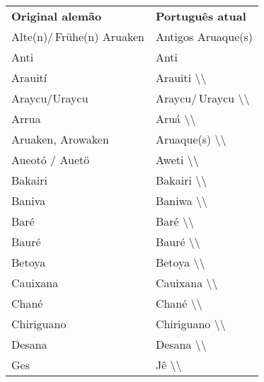 
\begin{table}[]
\begin{tabular}{|l|l|}
\textbf{Original alemão}   & \textbf{Português atual}                          \\
Alte(n)/\,Frühe(n) Aruaken & Antigos Aruaque(s)                             \\
Anti                       & Anti                                           \\
Arauití                    & Arauiti \textbackslash{}\textbackslash{}       \\
Araycu/Uraycu              & Araycu/\,Uraycu \textbackslash{}\textbackslash{} \\
Arrua                      & Aruá \textbackslash{}\textbackslash{}          \\
Aruaken, Arowaken          & Aruaque(s) \textbackslash{}\textbackslash{}    \\
Aueotó / Auetö             & Aweti \textbackslash{}\textbackslash{}         \\
Bakairi                    & Bakairi \textbackslash{}\textbackslash{}       \\
Baniva                     & Baniwa \textbackslash{}\textbackslash{}        \\
Baré                       & Baré \textbackslash{}\textbackslash{}          \\
Bauré                      & Bauré \textbackslash{}\textbackslash{}         \\
Betoya                     & Betoya \textbackslash{}\textbackslash{}        \\
Cauixana                   & Cauixana \textbackslash{}\textbackslash{}      \\
Chané                      & Chané \textbackslash{}\textbackslash{}         \\
Chiriguano                 & Chiriguano \textbackslash{}\textbackslash{}    \\
Desana                     & Desana \textbackslash{}\textbackslash{}        \\
Ges                        & Jê \textbackslash{}\textbackslash{}            \\

\end{tabular}
\end{table}
